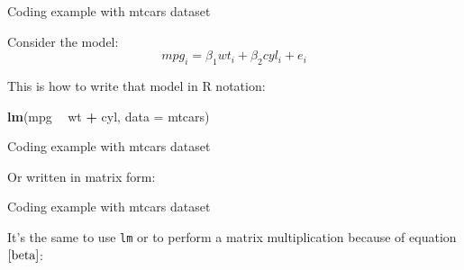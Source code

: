 \documentclass[ignorenonframetext,compress,aspectratio=169]{beamer}
\newenvironment{Shaded}{\begin{snugshade}}{\end{snugshade}}
\newcommand{\KeywordTok}[1]{\textcolor[rgb]{0.13,0.29,0.53}{\textbf{#1}}}
\newcommand{\DataTypeTok}[1]{\textcolor[rgb]{0.13,0.29,0.53}{#1}}
\newcommand{\DecValTok}[1]{\textcolor[rgb]{0.00,0.00,0.81}{#1}}
\newcommand{\StringTok}[1]{\textcolor[rgb]{0.31,0.60,0.02}{#1}}
\newcommand{\OperatorTok}[1]{\textcolor[rgb]{0.81,0.36,0.00}{\textbf{#1}}}
\newcommand{\NormalTok}[1]{#1}
\begin{document}
\begin{frame}[fragile]{Coding example with mtcars dataset}

Consider the model: \[mpg_i = \beta_1 wt_i + \beta_2 cyl_i + e_i\]

This is how to write that model in R notation:

\begin{Shaded}
\begin{Highlighting}[]
\KeywordTok{lm}\NormalTok{(mpg }\OperatorTok{~}\StringTok{ }\NormalTok{wt }\OperatorTok{+}\StringTok{ }\NormalTok{cyl, }\DataTypeTok{data =}\NormalTok{ mtcars)}
\end{Highlighting}
\end{Shaded}

\end{frame}

\begin{frame}[fragile]{Coding example with mtcars dataset}

Or written in matrix form:

\begin{Shaded}
\end{Shaded}

\end{frame}

\begin{frame}[fragile]{Coding example with mtcars dataset}

It's the same to use \texttt{lm} or to perform a matrix multiplication
because of equation \(\eqref{beta}\):

\begin{Shaded}
\end{Shaded}

\end{frame}
\end{document}
